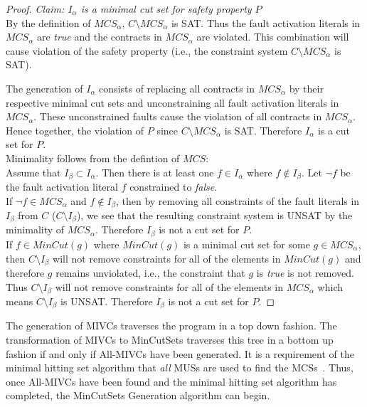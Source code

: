 \begin{theorem}
\begin{proof}
\textit{Claim: $I_\alpha$ is a minimal cut set for safety property $P$}\\
By the definition of $MCS_\alpha$, $C\setminus MCS_\alpha$ is SAT. Thus the fault activation literals in $MCS_\alpha$ are \textit{true} and the contracts in $MCS_\alpha$ are violated. This combination will cause violation of the safety property (i.e., the constraint system $C\setminus MCS_\alpha$ is SAT). 

The generation of $I_\alpha$ consists of replacing all contracts in $MCS_\alpha$ by their respective minimal cut sets and unconstraining all fault activation literals in $MCS_\alpha$. These unconstrained faults cause the violation of all contracts in $MCS_\alpha$. Hence together, the violation of $P$ since $C\setminus MCS_\alpha$ is SAT. Therefore $I_\alpha$ is a cut set for $P$.\\

Minimality follows from the defintion of $MCS$: \\

Assume that $I_\beta \subset I_\alpha$. Then there is at least one $f \in I_\alpha$ where $f \not \in I_\beta$. Let $\lnot f$ be the fault activation literal $f$ constrained to \textit{false}. \\

If $ \lnot f \in MCS_\alpha$ and $f \not \in I_\beta$, then by removing all constraints of the fault literals in $I_\beta$ from $C$ ($C \setminus I_\beta$), we see that the resulting constraint system is UNSAT by the minimality of $MCS_\alpha$. Therefore $I_\beta$ is not a cut set for $P$.\\

If $f \in MinCut(g)$ where $MinCut(g)$ is a minimal cut set for some $g \in MCS_\alpha$, then $C \setminus I_\beta$ will not remove constraints for all of the elements in $MinCut(g)$ and therefore $g$ remains unviolated, i.e., the constraint that $g$ is \textit{true} is not removed. Thus $C \setminus I_\beta$ will not remove constraints for all of the elements in $MCS_\alpha$ which means $C \setminus I_\beta$ is UNSAT. Therefore $I_\beta$ is not a cut set for $P$.

\end{proof}
\end{theorem}

The generation of MIVCs traverses the program in a top down fashion. The transformation of MIVCs to MinCutSets traverses this tree in a bottom up fashion if and only if All-MIVCs have been generated. It is a requirement of the minimal hitting set algorithm that \textit{all} MUSs are used to find the MCSs~\cite{liffiton2016fast,gainer2017minimal,murakami2013efficient}. Thus, once All-MIVCs have been found and the minimal hitting set algorithm has completed, %
the MinCutSets Generation algorithm can begin. 

